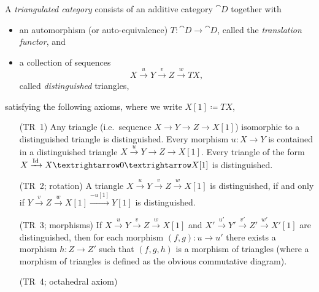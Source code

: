 \documentclass[english]{short-notes}
\begin{document}
\begin{Def}
    A \emph{triangulated category} consists of an additive category $\cat D$ together with
    \begin{itemize}
        \item an automorphism (or auto-equivalence) $T\colon \cat D → \cat D$, called the \emph{translation functor}, and
        \item a collection of sequences
            \[ X \xrightarrow{u} Y \xrightarrow{v} Z \xrightarrow{w} TX, \]
            called \emph{distinguished} triangles,
    \end{itemize}
    satisfying the following axioms, where we write $X[1] \coloneq TX$,
        \begin{enumerate}
            \item[(TR~1)]
                Any triangle (i.e.\ sequence $X → Y → Z → X[1]$) isomorphic to a distinguished triangle is distinguished.
                Every morphism $u\colon X → Y$ is contained in a distinguished triangle $X \xrightarrow{u} Y → Z → X[1]$.
                Every triangle of the form $X \xrightarrow{\id} X → 0 → X[1]$ is distinguished.
            \item[(TR~2; rotation)]
                A triangle $X \xrightarrow{u} Y \xrightarrow{v} Z \xrightarrow{w} X[1]$ is distinguished, if and only if $Y \xrightarrow{v} Z \xrightarrow{w} X[1] \xrightarrow{-u[1]} Y[1]$ is distinguished.
            \item[(TR~3; morphisms)] 
                If $X \xrightarrow{u} Y \xrightarrow{v} Z \xrightarrow{w} X[1]$ and
                $X' \xrightarrow{u'} Y' \xrightarrow{v'} Z' \xrightarrow{w'} X'[1]$
                are distinguished, then for each morphism $(f,g)\colon u → u'$ there exists a morphism $h\colon Z → Z'$ such that $(f,g,h)$ is a morphism of triangles (where a morphism of triangles is defined as the obvious commutative diagram).
            \item[(TR~4; octahedral axiom)]
\end{enumerate}
\end{Def}
\end{document}
